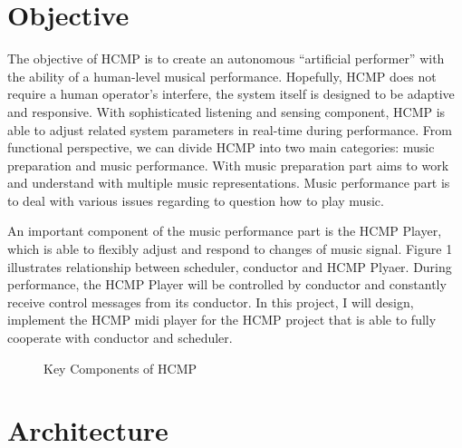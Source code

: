 \section{Objective}
The objective of HCMP \cite{Dawen:2011} is to create an autonomous 
``artificial performer'' with the ability of a human-level musical performance. 
Hopefully, HCMP does not require a human operator's interfere, the system itself 
is designed to be adaptive and responsive. With sophisticated listening and sensing
component, HCMP is able to adjust related system parameters in real-time during 
performance. From functional perspective, we can divide HCMP into two main
categories: music preparation and music performance. With music preparation
part aims to work and understand with multiple music representations. Music
performance part is to deal with various issues regarding to question 
how to play music.     

An important component of the music performance part is the HCMP Player, 
which is able to flexibly  
adjust and respond to changes of music signal. Figure 1 illustrates relationship 
between scheduler, conductor and HCMP Plyaer. During performance, the HCMP Player will 
be controlled by conductor and constantly receive control messages 
from its conductor. In this project, I will design, implement the HCMP midi player 
for the HCMP project that is able to fully cooperate with conductor and scheduler.
\begin{figure}[H] %
\caption{Key Components of HCMP}
\label{fig:speciation}
\end{figure}
 

\section{Architecture}

